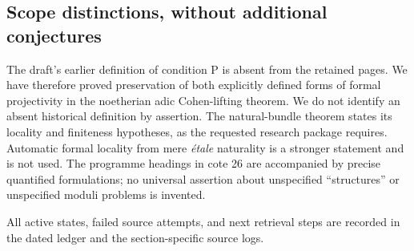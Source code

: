 \subsection{Scope distinctions, without additional conjectures}

The draft's earlier definition of condition P is absent from the retained
pages. We have therefore proved preservation of both explicitly defined
forms of formal projectivity in the noetherian adic Cohen-lifting theorem.
We do not identify an absent historical definition by assertion.
The natural-bundle theorem states its locality and finiteness hypotheses,
as the requested research package requires. Automatic formal locality
from mere \emph{\'etale} naturality is a stronger statement and is not
used. The programme headings in cote 26 are accompanied by precise
quantified formulations; no universal assertion about unspecified
``structures'' or unspecified moduli problems is invented.

All active states, failed source attempts, and next retrieval steps are
recorded in the dated ledger and the section-specific source logs.
